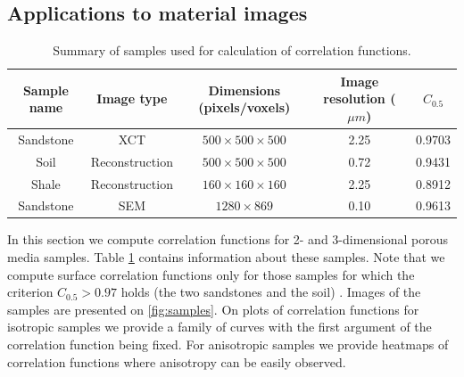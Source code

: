 \documentclass[reprint,amsmath,amssymb,aps,pre,showkeys,showpacs]{revtex4-1}
\begin{document}
\subsection{Applications to material images}

\begin{table}[!htp]
  \centering
  \begin{tabular}{|c|c|c|c|c|}
    \hline
    Sample name & Image type & Dimensions (pixels/voxels) & Image resolution ($\mu m$)
    & $C_{0.5}$ \\
    \hline
    Sandstone & XCT &  $500 \times 500 \times 500$ & 2.25 & 0.9703 \\
    Soil & Reconstruction & $500 \times 500 \times 500$ & 0.72 & 0.9431 \\
    Shale & Reconstruction & $160 \times 160 \times 160$ & 2.25 & 0.8912 \\
    Sandstone & SEM &  $1280 \times 869$ & 0.10 & 0.9613 \\
    \hline
  \end{tabular}
  \caption{Summary of samples used for calculation of correlation functions.}
  \label{tab:summary}
\end{table}
In this section we compute correlation functions for 2- and 3-dimensional porous
media samples. Table \ref{tab:summary} contains information about these
samples. Note that we compute surface correlation functions only for those
samples for which the criterion $C_{0.5} > 0.97$ holds (the two sandstones and
the soil) \cite{samarin2023robust}. Images of the samples are presented on
\cref{fig:samples}. On plots of correlation functions for isotropic samples we
provide a family of curves with the first argument of the correlation function
being fixed. For anisotropic samples we provide heatmaps of correlation
functions where anisotropy can be easily observed.
\end{document}
